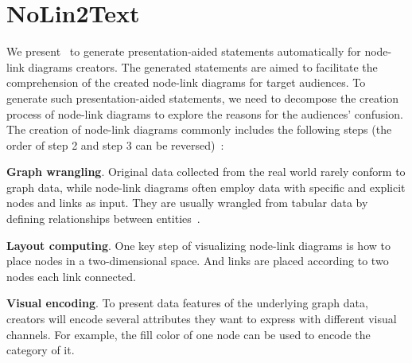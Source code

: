 \section{NoLin2Text}
We present \ApproachName~to generate presentation-aided statements automatically for node-link diagrams creators. The generated statements are aimed to facilitate the comprehension of the created node-link diagrams for target audiences.
To generate such presentation-aided statements, we need to decompose the creation process of node-link diagrams to explore the reasons for the audiences' confusion.
The creation of node-link diagrams commonly includes the following steps (the order of step 2 and step 3 can be reversed)~\cite{DBLP:journals/cgf/SpritzerBDFF15, tvcg/RomatAP21}:
\begin{compactenum}
    \item \textbf{Graph wrangling}. Original data collected from the real world rarely conform to graph data, while node-link diagrams often employ data with specific and explicit nodes and links as input. They are usually wrangled from tabular data by defining relationships between entities~\cite{DBLP:journals/tvcg/SrinivasanPEB18, DBLP:conf/ieeevast/BigelowNML19, DBLP:journals/ivs/HeerP14, DBLP:journals/ivs/LiuNS14}.
    \item \textbf{Layout computing}. One key step of visualizing node-link diagrams is how to place nodes in a two-dimensional space. And links are placed according to two nodes each link connected.
    \item \textbf{Visual encoding}. To present data features of the underlying graph data, creators will encode several attributes they want to express with different visual channels. For example, the fill color of one node can be used to encode the category of it.
\end{compactenum}


